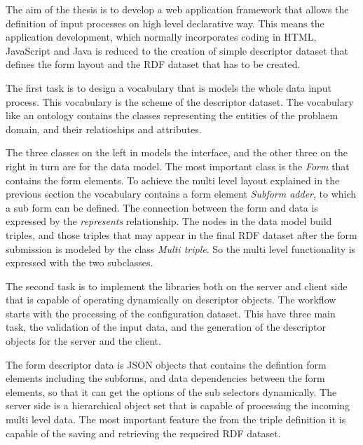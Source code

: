 The aim of the thesis is to develop a web application framework that allows the definition of input processes on high level declarative way. This means the application development, which normally incorporates coding in HTML, JavaScript and Java is reduced to the creation of simple descriptor dataset that defines the form layout and the RDF dataset that has to be created.

The first task is to design a vocabulary that is models the whole data input process. This vocabulary is the scheme of the descriptor dataset. The vocabulary like an ontology contains the classes representing the entities of the problaem domain, and their relatioships and attributes.



The three classes on the left in  models the interface, and the other three on the right in turn are for the data model. The most important class is the \textit{Form} that contains the form elements. To achieve the multi level layout explained in the previous section the vocabulary contains a form element \textit{Subform adder}, to which a sub form can be defined. The connection between the form and data is expressed by the \textit{represents} relationship. The nodes in the data model build triples, and those triples that may appear in the final RDF dataset after the form submission is modeled by the class \textit{Multi triple}. So the multi level functionality is expressed with the two subclasses.

The second task is to implement the libraries both on the server and client side that is capable of operating dynamically on descriptor objects. The workflow starts with the processing of the configuration dataset. This have three main task, the validation of the input data, and the generation of the descriptor objects for the server and the client.



The form descriptor data is JSON objects that contains the defintion form elements including the subforms, and data dependencies between the form elements, so that it can get the options of the sub selectors dynamically. The server side is a hierarchical object set that is capable of processing the incoming multi level data. The most important feature the from the triple definition it is capable of the saving and retrieving the requeired RDF dataset.






